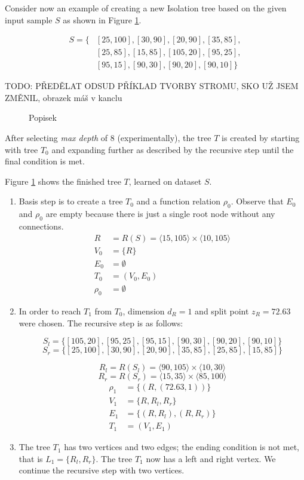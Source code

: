 \begin{example}
\label{example:original_tree_create}
Consider now an example of creating a new Isolation tree based on the given input sample $S$ as shown in Figure \ref{fig:example_noutlier_gnu}.

\begin{align*}
    S = \{&[25,100],[30,90],[20,90],[35,85],\\
    &[25,85],[15,85],[105,20],[95,25], \\
    &[95,15],[90,30],[90,20],[90,10]\}
\end{align*}

TODO: PŘEDĚLAT ODSUD PŘÍKLAD TVORBY STROMU, SKO UŽ JSEM ZMĚNIL, obrazek máš v kanclu


\begin{figure}[htbp]
\centering

\caption{Popisek}
\label{fig:example_noutlier_gnu}
\end{figure}

After selecting \emph{max depth} of 8 (experimentally), the tree $T$ is created by starting with tree $T_0$ and expanding further as described by the recursive step until the final condition is met.

Figure \ref{fig:example_noutlier_gnu} shows the finished tree $T$, learned on dataset $S$.

\begin{enumerate}
    \item Basis step is to create a tree $T_0$ and a function relation $\rho_0$. 
    Observe that $E_0$ and $\rho_0$ are empty because there is just a single root node without any connections.
\begin{align*}
R &= R(S) = \langle 15, 105 \rangle \times \langle 10, 105 \rangle\\
V_0 &= \{R\}\\
E_0 &= \emptyset\\
T_0 &= (V_0, E_0)\\
\rho_0 &= \emptyset
\end{align*}    

\item In order to reach $T_1$ from $T_0$, dimension $d_R=1$ and split point $z_R = 72.63$ were chosen. The recursive step is as follows:

$$S_l = \{[105,20],[95,25],[95,15],[90,30],[90,20],[90,10]\}$$
$$S_r = \{[25,100],[30,90],[20,90],[35,85],[25,85],[15,85]\}$$

$$R_l = R(S_l) = \langle 90, 105 \rangle \times \langle 10, 30 \rangle$$
$$R_r = R(S_r) = \langle 15, 35 \rangle \times \langle 85, 100 \rangle$$
\begin{align*}
\rho_1 &= \{ (R, (72.63, 1))\}\\
V_1 &= \{R, R_l, R_r\}\\
E_1 &= \{(R,R_l), (R,R_r)\}\\
T_1 &= (V_1, E_1)
\end{align*}
\item The tree $T_1$ has two vertices and two edges; the ending condition is not met, that is $L_1 = \{R_l,R_r\}$. The tree $T_1$ now has a left and right vertex. We continue the recursive step with two vertices.


\end{enumerate}
\end{example}
